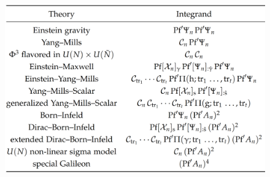 \documentclass{beamer}
\begin{document}
\begin{frame}
    \begin{figure}
        \centering
        \includegraphics[width=1\linewidth]{4.png}
    \end{figure}
\end{frame}
\end{document}
